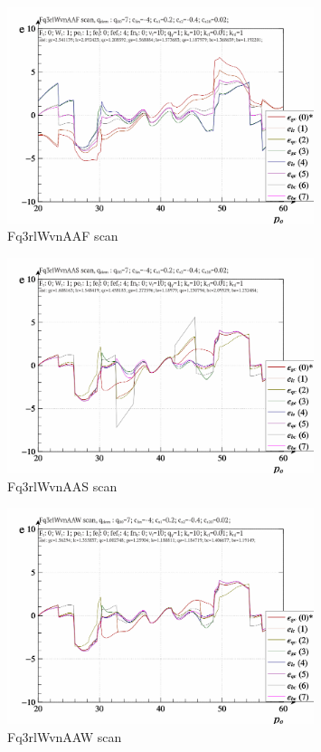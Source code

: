 \documentclass[a4paper,10pt]{article}
\begin{document}
\begin{figure}[htb!]
  \centerline{
    \includegraphics[width=0.8\textwidth]{qls-p_p_e_Fq3rlWvnAAF_scan.png}
  }
  \caption{Fq3rlWvnAAF scan}
  \label{atu:f:Fq3rlWvnAAF_scan}
\end{figure}

\begin{figure}[htb!]
  \centerline{
    \includegraphics[width=0.8\textwidth]{qls-p_p_e_Fq3rlWvnAAS_scan.png}
  }
  \caption{Fq3rlWvnAAS scan}
  \label{atu:f:Fq3rlWvnAAS_scan}
\end{figure}

\begin{figure}[htb!]
  \centerline{
    \includegraphics[width=0.8\textwidth]{qls-p_p_e_Fq3rlWvnAAW_scan.png}
  }
  \caption{Fq3rlWvnAAW scan}
  \label{atu:f:Fq3rlWvnAAW_scan}
\end{figure}
\end{document}
